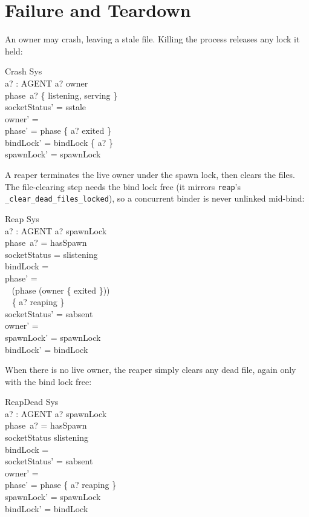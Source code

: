 \documentclass[a4paper,10pt,fleqn]{article}
\begin{document}
\section{Failure and Teardown}

An owner may crash, leaving a stale file.  Killing the process releases
any lock it held:

\begin{schema}{Crash}
  \Delta Sys \\
  a? : AGENT
\where
  a? \in owner \\
  phase~a? \in \{ listening, serving \} \\
  socketStatus' = sstale \\
  owner' = \emptyset \\
  phase' = phase \oplus \{ a? \mapsto exited \} \\
  bindLock' = bindLock \setminus \{ a? \} \\
  spawnLock' = spawnLock
\end{schema}

A reaper terminates the live owner under the spawn lock, then clears the
files.  The file-clearing step needs the bind lock free (it mirrors
\texttt{reap}'s \texttt{\_clear\_dead\_files\_locked}), so a concurrent
binder is never unlinked mid-bind:

\begin{schema}{Reap}
  \Delta Sys \\
  a? : AGENT
\where
  a? \in spawnLock \\
  phase~a? = hasSpawn \\
  socketStatus = slistening \\
  bindLock = \emptyset \\
  phase' = \\
  \quad~ (phase \oplus (owner \cross \{ exited \})) \\
  \quad~ \oplus \{ a? \mapsto reaping \} \\
  socketStatus' = sabsent \\
  owner' = \emptyset \\
  spawnLock' = spawnLock \\
  bindLock' = bindLock
\end{schema}

When there is no live owner, the reaper simply clears any dead file,
again only with the bind lock free:

\begin{schema}{ReapDead}
  \Delta Sys \\
  a? : AGENT
\where
  a? \in spawnLock \\
  phase~a? = hasSpawn \\
  socketStatus \neq slistening \\
  bindLock = \emptyset \\
  socketStatus' = sabsent \\
  owner' = \emptyset \\
  phase' = phase \oplus \{ a? \mapsto reaping \} \\
  spawnLock' = spawnLock \\
  bindLock' = bindLock
\end{schema}
\end{document}
